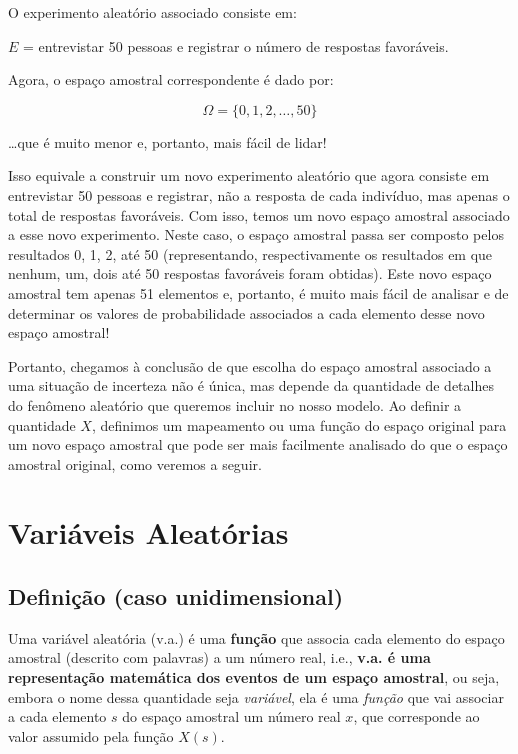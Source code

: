 \documentclass[
]{book}
\theoremstyle{definition}
\theoremstyle{definition}
\theoremstyle{definition}
\theoremstyle{remark}
\begin{document}
O experimento aleatório associado consiste em:

\(E\) = entrevistar 50 pessoas e registrar o número de respostas favoráveis.

Agora, o espaço amostral correspondente é dado por:

\[\Omega = \{0, 1, 2, \ldots, 50\}\]

\ldots que é muito menor e, portanto, mais fácil de lidar!

Isso equivale a construir um novo experimento aleatório que agora consiste em entrevistar 50 pessoas e registrar, não a resposta de cada indivíduo, mas apenas o total de respostas favoráveis. Com isso, temos um novo espaço amostral associado a esse novo experimento. Neste caso, o espaço amostral passa ser composto pelos resultados 0, 1, 2, até 50 (representando, respectivamente os resultados em que nenhum, um, dois até 50 respostas favoráveis foram obtidas). Este novo espaço amostral tem apenas 51 elementos e, portanto, é muito mais fácil de analisar e de determinar os valores de probabilidade associados a cada elemento desse novo espaço amostral!

Portanto, chegamos à conclusão de que escolha do espaço amostral associado a uma situação de incerteza não é única, mas depende da quantidade de detalhes do fenômeno aleatório que queremos incluir no nosso modelo. Ao definir a quantidade \(X\), definimos um mapeamento ou uma função do espaço original para um novo espaço amostral que pode ser mais facilmente analisado do que o espaço amostral original, como veremos a seguir.

\hypertarget{variuxe1veis-aleatuxf3rias}{%
\section{Variáveis Aleatórias}\label{variuxe1veis-aleatuxf3rias}}

\hypertarget{definiuxe7uxe3o-caso-unidimensional}{%
\subsection*{Definição (caso unidimensional)}\label{definiuxe7uxe3o-caso-unidimensional}}

Uma variável aleatória (v.a.) é uma \textbf{função} que associa cada elemento do espaço amostral (descrito com palavras) a um número real, i.e., \textbf{v.a. é uma representação matemática dos eventos de um espaço amostral}, ou seja, embora o nome dessa quantidade seja \emph{variável}, ela é uma \emph{função} que vai associar a cada elemento \(s\) do espaço amostral um número real \(x\), que corresponde ao valor assumido pela função \(X(s)\).
\end{document}
